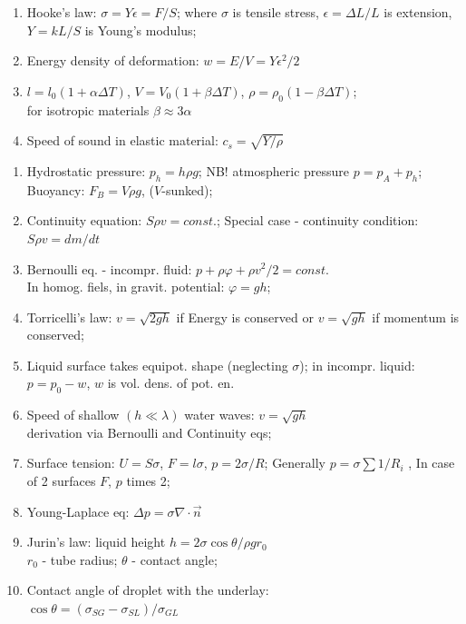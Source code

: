\documentclass{article}
\begin{document}
\begin{multicols}{3}
        \begin{enumerate}
            \item Hooke's law: $\sigma=Y\epsilon=F/S$; where $\sigma$ is tensile stress, $\epsilon=\Delta L/L$ is extension, $Y=kL/S$ is Young's modulus;
            \item Energy density of deformation: $w=E/V=Y\epsilon^2/2$
            \item $l=l_0(1+\alpha\Delta T)$, $V=V_0(1+\beta\Delta T)$, $\rho=\rho_0(1-\beta\Delta T)$;\\for isotropic materials $\beta\approx 3\alpha$
            \item Speed of sound in elastic material: $c_s=\sqrt{Y/\rho}$
        \end{enumerate}

        \begin{enumerate}
            \item Hydrostatic pressure: $p_h=h\rho g$; NB! atmospheric pressure $p=p_A+p_h$; Buoyancy: $F_B=V\rho g$, ($V$-sunked);
            \item Continuity equation: $S\rho v=const.$; Special case - continuity condition: $S\rho v=dm/dt$
            \item Bernoulli eq. - incompr. fluid: $p+\rho\varphi+\rho v^2/2=const.$\\In homog. fiels, in gravit. potential: $\varphi=gh$;
            \item Torricelli's law: $v=\sqrt{2gh}$ if Energy  is conserved or $v=\sqrt{gh}$ if momentum is conserved;
            \item Liquid surface takes equipot. shape (neglecting $\sigma$); in incompr. liquid: $p=p_0-w$, $w$ is vol. dens. of pot. en.
            \item Speed of shallow $(h\ll\lambda)$ water waves: $v=\sqrt{gh}$\\derivation via Bernoulli and Continuity eqs;
            \item Surface tension: $U=S\sigma$, $F=l\sigma$, $p=2\sigma/R$; Generally $p=\sigma\sum 1/R_i$ , In case of 2 surfaces $F$, $p$ times 2;
            \item Young-Laplace eq: $\Delta p=\sigma\nabla\cdot\vec n$
            \item Jurin's law: liquid height $h=2\sigma\cos\theta/\rho gr_0$\\$r_0$ - tube radius; $\theta$ - contact angle;
            \item Contact angle of droplet with the underlay:\\$\cos\theta=(\sigma_{SG}-\sigma_{SL})/\sigma_{GL}$
        \end{enumerate}

    \newpage
\end{multicols}
\end{document}
